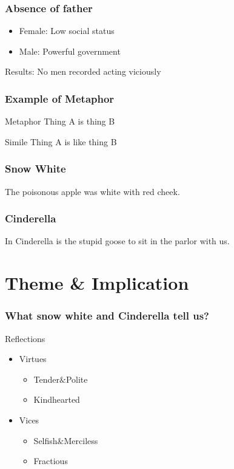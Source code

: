 \documentclass{beamer}
\begin{document}
\begin{frame}
    \frametitle{Absence of father}
    \Large
    \begin{itemize}
        \item Female: Low social status
        \item Male: Powerful government
    \end{itemize}
    \huge{\alert{Results: No men recorded acting viciously}}
\end{frame}

\begin{frame}
    \frametitle{Example of Metaphor}
    \Large
    \begin{block}{Metaphor}
        Thing A is thing B
    \end{block}


    \begin{block}{Simile}
        Thing A is like thing B
    \end{block}
\end{frame}

\begin{frame}
    \frametitle{Snow White}
    \huge{The poisonous apple was white with red cheek.}
\end{frame}

\begin{frame}
    \frametitle{Cinderella}
    \huge{In Cinderella is the stupid goose to sit in the parlor with us.}
\end{frame}

\section{Theme \& Implication}
\begin{frame}
    \frametitle{What snow white and Cinderella tell us?}
    \Large
    \begin{block}{Reflections}
        \begin{itemize}
            \item Virtues
                  \begin{itemize}
                      \item Tender$\&$Polite
                      \item Kindhearted
                  \end{itemize}
            \item Vices
                  \begin{itemize}
                      \item Selfish$\&$Merciless
                      \item Fractious
                  \end{itemize}
        \end{itemize}
    \end{block}
\end{frame}
\end{document}

